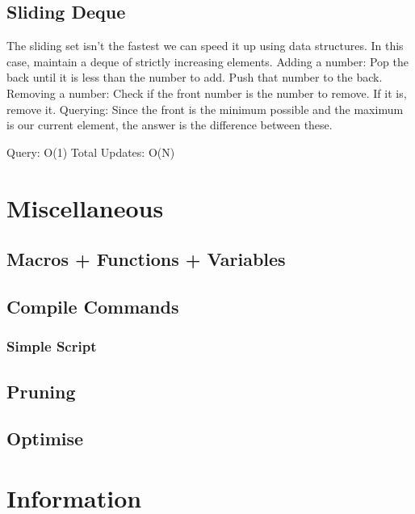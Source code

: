 \documentclass{article}
\begin{document}
\subsection{Sliding Deque}
\begin{flushleft}
The sliding set isn't the fastest we can speed it up using data structures.
In this case, maintain a deque of strictly increasing elements.
\newline
Adding a number: Pop the back until it is less than the number to add. Push that number to the back.
Removing a number: Check if the front number is the number to remove. If it is, remove it.
Querying: Since the front is the minimum possible and the maximum is our current element, the answer is the difference between these.

Query: O(1)
Total Updates: O(N)
\end{flushleft}


\section{Miscellaneous}
\subsection{Macros + Functions + Variables}


\subsection{Compile Commands}

\subsubsection{Simple Script}


\subsection{Pruning}


\subsection{Optimise}


\section{Information}
\end{document}
